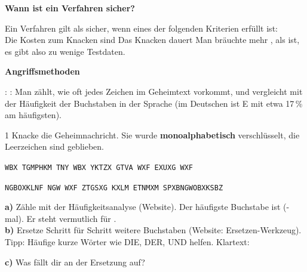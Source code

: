 \documentclass[11pt,a4paper]{article}
\begin{document}

\textbf{Wann ist ein Verfahren sicher?}\par
{\lueckentext Ein Verfahren gilt als sicher, wenn eines der folgenden Kriterien erfüllt ist:\\
 Die Kosten zum Knacken sind 
 Das Knacken dauert 
 Man bräuchte mehr , als  ist, es gibt also zu wenige Testdaten.\par}

\medskip
\textbf{Angriffsmethoden}\par
{\lueckentext
{}: 
: Man zählt, wie oft jedes Zeichen im Geheimtext vorkommt, und vergleicht mit der Häufigkeit der Buchstaben in der Sprache (im Deutschen ist E mit etwa 17\,\% am häufigsten).\par}

\begin{aufgabe}[Häufigkeitsanalyse]{1}
Knacke die Geheimnachricht. Sie wurde \textbf{monoalphabetisch} verschlüsselt, die Leerzeichen sind geblieben.\par\vspace{1mm}
\centerline{\texttt{WBX TGMPHKM TNY WBX YKTZX GTVA WXF EXUXG WXF}}
\centerline{\texttt{NGBOXKLNF NGW WXF ZTGSXG KXLM ETNMXM SPXBNGWOBXKSBZ}}\par\vspace{1mm}
{\lueckentext\textbf{a)} Zähle mit der Häufigkeitsanalyse (Website). Der häufigste Buchstabe ist  (-mal). Er steht vermutlich für .\\
\textbf{b)} Ersetze Schritt für Schritt weitere Buchstaben (Website: Ersetzen-Werkzeug). Tipp: Häufige kurze Wörter wie DIE, DER, UND helfen. Klartext:\par}
{\lueckentext\textbf{c)} Was fällt dir an der Ersetzung auf? \par}
\end{aufgabe}
\end{document}
